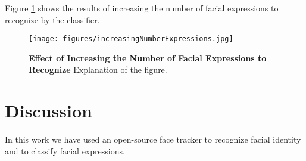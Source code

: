 \documentclass[]{article}
\begin{document}
Figure \ref{increasingNumberExpressions} shows the results of increasing the number of facial expressions to recognize
by the classifier.

\begin{figure}[ht]
\begin{center}
\vspace{-3mm}
\texttt{[image: figures/increasingNumberExpressions.jpg]}
\end{center}
\caption{\textbf{Effect of Increasing the Number of Facial Expressions to Recognize} Explanation of the figure.}
\label{increasingNumberExpressions}
\end{figure}

\section{Discussion}
In this work we have used an open-source face tracker to recognize facial identity and to classify facial expressions.




\end{document}
